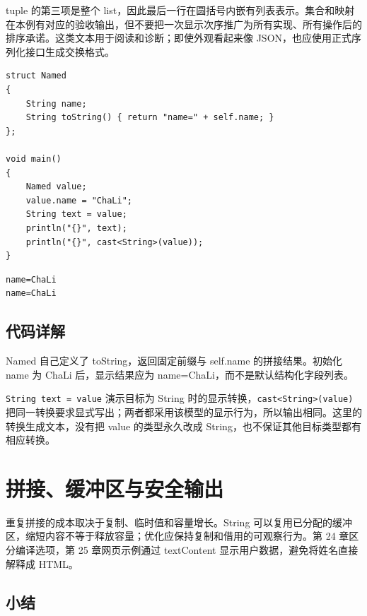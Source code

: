 tuple 的第三项是整个 list，因此最后一行在圆括号内嵌有列表表示。集合和映射在本例有对应的验收输出，但不要把一次显示次序推广为所有实现、所有操作后的排序承诺。这类文本用于阅读和诊断；即使外观看起来像 JSON，也应使用正式序列化接口生成交换格式。

\par
\medskip
\begin{lstlisting}[style=chali]
struct Named
{
    String name;
    String toString() { return "name=" + self.name; }
};

void main()
{
    Named value;
    value.name = "ChaLi";
    String text = value;
    println("{}", text);
    println("{}", cast<String>(value));
}
\end{lstlisting}
\par
\medskip

\par
\medskip
\begin{lstlisting}[style=out]
name=ChaLi
name=ChaLi
\end{lstlisting}
\par
\medskip

\subsection*{代码详解}

Named 自己定义了 toString，返回固定前缀与 self.name 的拼接结果。初始化 name 为 ChaLi 后，显示结果应为 name=ChaLi，而不是默认结构化字段列表。

\texttt{String text =\allowbreak{} value} 演示目标为 String 时的显示转换，\texttt{cast<\allowbreak{}String>\allowbreak{}(\allowbreak{}value)\allowbreak{}} 把同一转换要求显式写出；两者都采用该模型的显示行为，所以输出相同。这里的转换生成文本，没有把 value 的类型永久改成 String，也不保证其他目标类型都有相应转换。

\section{拼接、缓冲区与安全输出}

重复拼接的成本取决于复制、临时值和容量增长。String 可以复用已分配的缓冲区，缩短内容不等于释放容量；优化应保持复制和借用的可观察行为。第 24 章区分编译选项，第 25 章网页示例通过 textContent 显示用户数据，避免将姓名直接解释成 HTML。

\subsection*{小结}

